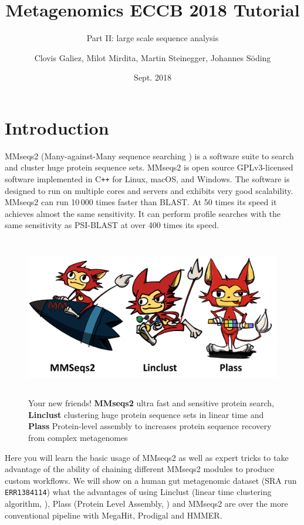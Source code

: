 \documentclass{scrartcl}
\begin{document}
\title{Metagenomics ECCB 2018 Tutorial}
\subtitle{Part II: large scale sequence analysis}
\author{Clovis Galiez, Milot Mirdita, Martin Steinegger, Johannes Söding}
\date{Sept. 2018}

\maketitle

\section{Introduction}
MMseqs2 (Many-against-Many sequence searching \citep{steinegger2017mmseqs2}) is a software suite to search and cluster huge protein sequence sets. MMseqs2 is open source GPLv3-licensed software implemented in C\texttt{++} for Linux, macOS, and Windows. The software is designed to run on multiple cores and servers and exhibits very good scalability. MMseqs2 can run 10\,000 times faster than BLAST. At 50 times its speed it achieves almost the same sensitivity. It can perform profile searches with the same sensitivity as PSI-BLAST at over 400 times its speed.

\begin{figure}[h!]
\centering
\includegraphics[height=70mm]{ThreeTools.png}
\caption{Your new friends! \textbf{MMseqs2} ultra fast and sensitive protein search, \textbf{Linclust} clustering huge protein sequence sets in linear time and \textbf{Plass} Protein-level assembly to increases protein sequence recovery from complex metagenomes}
\label{fig:universe}
\end{figure}

Here you will learn the basic usage of MMseqs2 as well as expert tricks to take advantage of the ability of chaining different MMseqs2 modules to produce custom workflows. We will show on a human gut metagenomic dataset (SRA run \texttt{ERR1384114}) what the advantages of using Linclust (linear time clustering algorithm, \cite{Steinegger:2018aa}), Plass (Protein Level Assembly,  \cite{Steinegger386110}) and MMseqs2 are over the more conventional pipeline with MegaHit\citep{li2015megahit}, Prodigal\citep{hyatt2010prodigal} and HMMER\citep{eddy2009new}.
\end{document}
